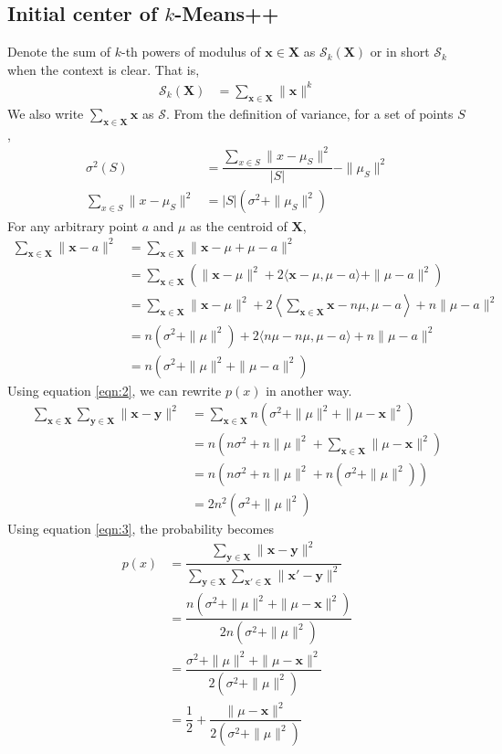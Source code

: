 \documentclass[twoside, 11pt]{article}
\newcommand{\x}{\mathbf{x}}
\newcommand{\X}{\mathbf{X}}
\newcommand{\y}{\mathbf{y}}
\renewcommand{\S}{\mathcal{S}}
\begin{document}
	\subsection{Initial center of $k$-Means++}
	Denote the sum of $k$-th powers of modulus of $\x\in\X$ as $\S_k(\X)$ or in short $\S_k$ when the context is clear. That is,
		\begin{align*}
			\S_k(\X) & = \sum_{\x\in\X}\|\x\|^k
		\end{align*}
	We also write $\sum_{\x\in\X}\x$ as $\S$. From the definition of variance, for a set of points $S$,
		\begin{align}
			\sigma^2(S) & = \dfrac{\sum_{x\in S} \|x-\mu_{S}\|^2}{|S|}-\|\mu_{S}\|^2\nonumber\\
			\sum_{x\in S}\|x-\mu_{S}\|^2 & = |S|(\sigma^2+\|\mu_{S}\|^2)\label{eqn:1}
		\end{align}
	For any arbitrary point $a$ and $\mu$ as the centroid of $\X$,
		\begin{align}
			\sum_{\x\in\X}\|\x-a\|^2
				  & = \sum_{\x\in\X}\|\x-\mu+\mu-a\|^2\nonumber\\
				  & = \sum_{\x\in\X}\left(\|\x-\mu\|^2+2\langle\x-\mu,\mu-a\rangle+\|\mu-a\|^2\right)\nonumber\\
				  & = \sum_{\x\in\X}\|\x-\mu\|^2+2\left\langle\sum_{\x\in\X}\x-n\mu,\mu-a\right\rangle+n\|\mu-a\|^2\nonumber\\
				  & = n(\sigma^2+\|\mu\|^2)+2\langle n\mu-n\mu,\mu-a\rangle+n\|\mu-a\|^2\nonumber\\
				  & = n(\sigma^2+\|\mu\|^2+\|\mu-a\|^2)\label{eqn:2}
		\end{align}
	Using equation \eqref{eqn:2}, we can rewrite $p(x)$ in another way.
		\begin{align}
			\sum_{\x\in\X}\sum_{\y\in\X}\|\x-\y\|^2 
				& = \sum_{\x\in\X}n(\sigma^2+\|\mu\|^2+\|\mu-\x\|^2)\nonumber\\
				& = n(n\sigma^2+n\|\mu\|^2+\sum_{\x\in\X}\|\mu-\x\|^2)\nonumber\\
				& = n(n\sigma^2+n\|\mu\|^2+n(\sigma^2+\|\mu\|^2))\nonumber\\
				& = 2n^2(\sigma^2+\|\mu\|^2)\label{eqn:3}
		\end{align}
	Using equation \eqref{eqn:3}, the probability becomes
		\begin{align*}
			p(x) & = \dfrac{\sum_{\y\in\X}\|\x-\y\|^2}{\sum_{\y\in\X}\sum_{\x'\in\X}\|\x'-\y\|^2}\\
				 & = \dfrac{n(\sigma^2+\|\mu\|^2+\|\mu-\x\|^2)}{2n(\sigma^2+\|\mu\|^2)}\\
				 & = \dfrac{\sigma^2+\|\mu\|^2+\|\mu-\x\|^2}{2(\sigma^2+\|\mu\|^2)}\\
				 & = \dfrac{1}{2}+\dfrac{\|\mu-\x\|^2}{2(\sigma^2+\|\mu\|^2)}
		\end{align*}
\end{document}
